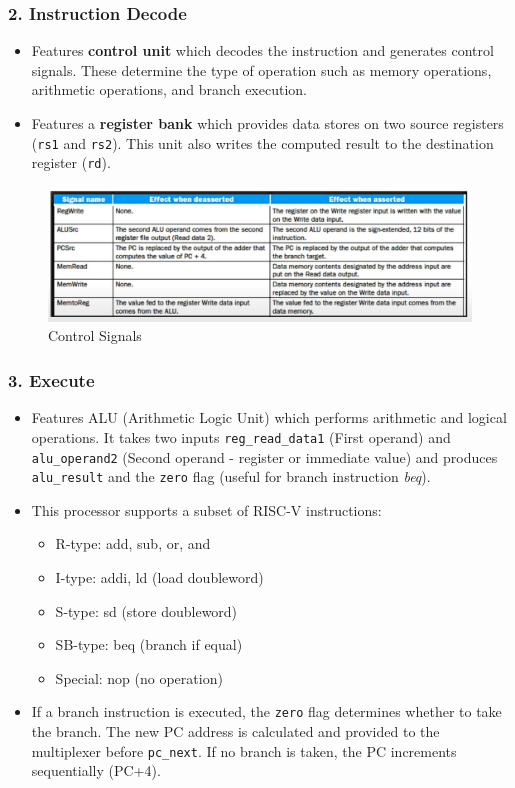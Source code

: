 \documentclass{article}
\numberwithin{figure}{section}
\numberwithin{table}{section}
\begin{document}
\subsubsection*{2. Instruction Decode}
\begin{itemize}
    \item Features \textbf{control unit} which decodes the instruction and generates control signals. These determine the type of operation such as memory operations, arithmetic operations, and branch execution.
    \item Features a \textbf{register bank} which provides data stores on two source registers (\texttt{rs1} and \texttt{rs2}). This unit also writes the computed result to the destination register (\texttt{rd}).
\end{itemize}
\begin{figure}[H]
    \centering
    \includegraphics[width=1.0\linewidth]{Control_Signals.jpg}
    \caption{Control Signals}
    \label{fig:control-signals}
\end{figure}
\subsubsection*{3. Execute}
\begin{itemize}
    \item Features ALU (Arithmetic Logic Unit) which performs arithmetic and logical operations. It takes two inputs \texttt{reg\_read\_data1} (First operand) and \texttt{alu\_operand2} (Second operand - register or immediate value) and produces \texttt{alu\_result} and the \texttt{zero} flag (useful for branch instruction \textit{beq}).
    \item This processor supports a subset of RISC-V instructions:
        \begin{itemize}
            \item R-type: add, sub, or, and
            \item I-type: addi, ld (load doubleword)
            \item S-type: sd (store doubleword)
            \item SB-type: beq (branch if equal)
            \item Special: nop (no operation)
        \end{itemize}
    \item If a branch instruction is executed, the \texttt{zero} flag determines whether to take the branch. The new PC address is calculated and provided to the multiplexer before \texttt{pc\_next}. If no branch is taken, the PC increments sequentially (PC+4).
\end{itemize}
\end{document}
